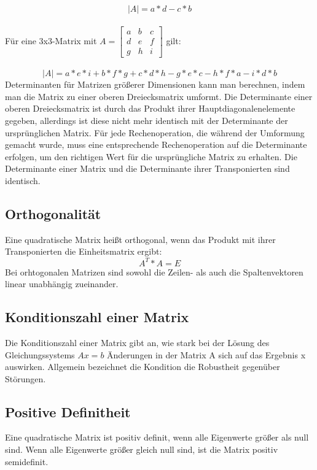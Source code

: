 \documentclass[11pt]{scrreprt}
\begin{document}
\begin{equation}
|A| = a*d - c*b
\end {equation}
\\
Für eine 3x3-Matrix mit $
A = 
\begin{bmatrix}
a & b & c \\
d & e & f \\
g & h & i
\end{bmatrix}
$  gilt:
\\
\\
\begin {equation}
|A| = a*e*i + b*f*g + c*d*h - g*e*c - h*f*a - i*d*b
\end {equation}
Determinanten für Matrizen größerer Dimensionen kann man berechnen, indem man die Matrix zu einer oberen Dreiecksmatrix umformt. Die Determinante einer oberen Dreiecksmatrix ist durch das Produkt ihrer Hauptdiagonalenelemente gegeben, allerdings ist diese nicht mehr identisch mit der Determinante der ursprünglichen Matrix. Für jede Rechenoperation, die während der Umformung gemacht wurde, muss eine entsprechende Rechenoperation auf die Determinante erfolgen, um den richtigen Wert für die ursprüngliche Matrix zu erhalten.
Die Determinante einer Matrix und die Determinante ihrer Transponierten sind identisch.
\subsection{Orthogonalität}
Eine quadratische Matrix heißt orthogonal, wenn das Produkt mit ihrer Transponierten die Einheitsmatrix ergibt:
\begin{equation}
A^T * A = E
\end{equation}
Bei orhtogonalen Matrizen sind sowohl die Zeilen- als  auch die Spaltenvektoren linear unabhängig zueinander.
\subsection{Konditionszahl einer Matrix}
Die Konditionszahl einer Matrix gibt an, wie stark bei der Lösung des Gleichungssystems $Ax=b$ Änderungen in der Matrix A sich auf das Ergebnis x auswirken. Allgemein bezeichnet die Kondition die Robustheit gegenüber Störungen.
\subsection{Positive Definitheit}
Eine quadratische Matrix ist positiv definit, wenn alle Eigenwerte größer als null sind. Wenn alle Eigenwerte größer gleich null sind, ist die Matrix positiv semidefinit.
\end{document}
